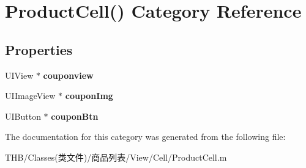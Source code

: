 \hypertarget{category_product_cell_07_08}{}\section{Product\+Cell() Category Reference}
\label{category_product_cell_07_08}
\subsection*{Properties}
\begin{DoxyCompactItemize}
\item 
\mbox{\label{category_product_cell_07_08_add76667d94b712e97eab7e864aff8278}} 
U\+I\+View $\ast$ {\bfseries couponview}
\item 
\mbox{\label{category_product_cell_07_08_a397f4b2b87bcd692edacd81f3400e5c8}} 
U\+I\+Image\+View $\ast$ {\bfseries coupon\+Img}
\item 
\mbox{\label{category_product_cell_07_08_af42e263a8cdf692f3fa49f6df43f5f3a}} 
U\+I\+Button $\ast$ {\bfseries coupon\+Btn}
\end{DoxyCompactItemize}


The documentation for this category was generated from the following file\+:\begin{DoxyCompactItemize}
\item 
T\+H\+B/\+Classes(类文件)/商品列表/\+View/\+Cell/Product\+Cell.\+m\end{DoxyCompactItemize}
